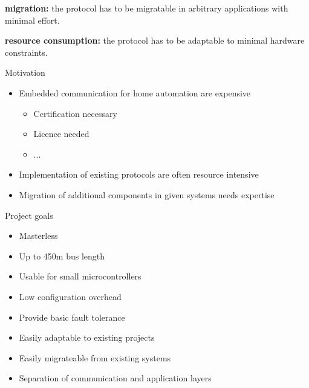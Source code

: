 \begin{req}
\label{req:ulftrtp:easy migration}
\textbf{migration: }the protocol has to be migratable in arbitrary applications with minimal effort.
\end{req}

\begin{req}
\label{req:ulftrtp:resource consumption}
\textbf{resource consumption: }the protocol has to be adaptable to minimal hardware constraints.
\end{req}


Motivation
\begin{center}
\begin{itemize}
  \item Embedded communication for home automation are expensive
    \begin{itemize}
      \item Certification necessary
      \item Licence needed
      \item ...
    \end{itemize}
  \item Implementation of existing protocols are often resource intensive
  \item Migration of additional components in given systems needs expertise
\end{itemize}
\end{center}

Project goals
\begin{center}
\begin{itemize}
 \item \begin{large}Masterless\end{large}
 \item \begin{large}Up to 450m bus length\end{large}
 \item \begin{large}Usable for small microcontrollers\end{large}
 \item \begin{large}Low configuration overhead\end{large}
 \item \begin{large}Provide basic fault tolerance\end{large}
 \item \begin{large}Easily adaptable to existing projects\end{large}
 \item \begin{large}Easily migrateable from existing systems\end{large}
 \item \begin{large}Separation of communication and application layers\end{large}
\end{itemize}
\end{center}




